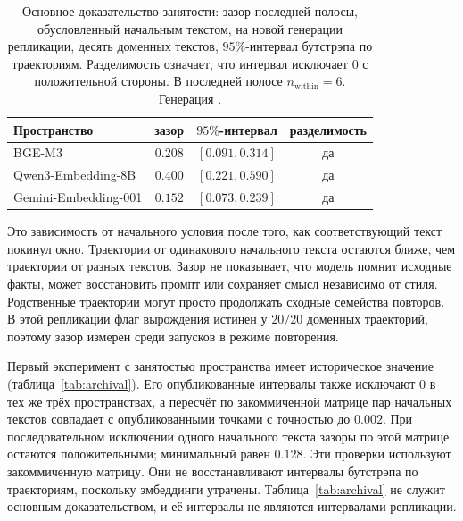 \documentclass[10pt]{article}
\begin{document}
\begin{table}[t]
  \centering
  \caption{Основное доказательство занятости: зазор последней полосы,
    обусловленный начальным текстом, на новой генерации репликации,
    десять доменных текстов, $95\%$-интервал бутстрэпа по траекториям. %
    Разделимость означает, что интервал исключает $0$ с положительной стороны.
    В последней полосе $n_{\mathrm{within}}{=}6$. %
    Генерация \protect{}.}
  \label{tab:repl}
  \begin{tabular}{@{}lccc@{}}
    \toprule
    Пространство & зазор & $95\%$-интервал & разделимость \\
    \midrule
    BGE-M3 & $0.208$ & $[0.091, 0.314]$ & да \\ %
    Qwen3-Embedding-8B & $0.400$ & $[0.221, 0.590]$ & да \\ %
    Gemini-Embedding-001 & $0.152$ & $[0.073, 0.239]$ & да \\ %
    \bottomrule
  \end{tabular}
\end{table}

Это зависимость от начального условия после того,
как соответствующий текст покинул окно.
Траектории от одинакового начального текста остаются ближе,
чем траектории от разных текстов.
Зазор не показывает, что модель помнит исходные факты,
может восстановить промпт или сохраняет смысл независимо от стиля.
Родственные траектории могут просто продолжать сходные семейства повторов.
В этой репликации флаг вырождения истинен у $20/20$ доменных траекторий,
поэтому зазор измерен среди запусков в режиме повторения. %

Первый эксперимент с занятостью пространства имеет историческое значение
(таблица~\ref{tab:archival}).
Его опубликованные интервалы также исключают $0$ в тех же трёх пространствах,
а пересчёт по закоммиченной матрице пар начальных текстов совпадает
с опубликованными точками с точностью до $0.002$. %
При последовательном исключении одного начального текста зазоры
по этой матрице остаются положительными; минимальный равен $0.128$. %
Эти проверки используют закоммиченную матрицу.
Они не восстанавливают интервалы бутстрэпа по траекториям,
поскольку эмбеддинги утрачены.
Таблица~\ref{tab:archival} не служит основным доказательством,
и её интервалы не являются интервалами репликации.
\end{document}
